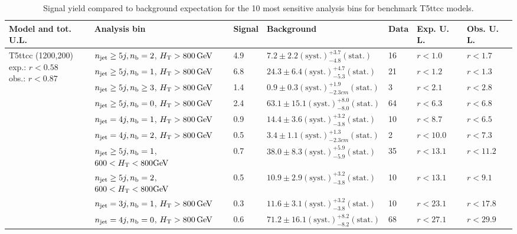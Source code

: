 \begin{table}[h!] 
  \scriptsize
  \caption{ 
Signal yield compared to background expectation for the 10 most sensitive analysis bins 
for benchmark T5ttcc models.
  \label{tab:sigBenchmarksYields_T5ttcc}}
  \centering 
  \begin{tabular}{ lllllll } 
    \hline 
    \hline 
    Model and tot. U.L. & Analysis bin & Signal & Background & Data & Exp. U. L. & Obs. U. L. \\ \hline
\multirow{10}{*}{\parbox[t]{2.3cm}{T5ttcc (1200,200)\\exp.: $r<0.58$\\obs.: $r<0.87$}}
 & $n_{\mathrm{jet}} \geq5j,n_{\text{b}} =2$, $\mbox{$H_\text{T}$} > 800 \, \mathrm{GeV}$ & 4.9 & $7.2 \pm 2.2 \mathrm{(syst.)} ^{+3.7}_{-4.8} \mathrm{(stat.)}$ & 16 & $r < 1.0$ & $r < 1.7$\\ 
 & $n_{\mathrm{jet}} \geq5j,n_{\text{b}} =1$, $\mbox{$H_\text{T}$} > 800 \, \mathrm{GeV}$ & 6.8 & $24.3 \pm 6.4 \mathrm{(syst.)} ^{+4.7}_{-5.3} \mathrm{(stat.)}$ & 21 & $r < 1.2$ & $r < 1.3$\\ 
 & $n_{\mathrm{jet}} \geq5j,n_{\text{b}} \geq3$, $\mbox{$H_\text{T}$} > 800 \, \mathrm{GeV}$ & 1.4 & $0.9 \pm 0.3 \mathrm{(syst.)} ^{+1.9}_{-2.3cm} \mathrm{(stat.)}$ & 3 & $r < 2.1$ & $r < 2.8$\\ 
 & $n_{\mathrm{jet}} \geq5j,n_{\text{b}} =0$, $\mbox{$H_\text{T}$} > 800 \, \mathrm{GeV}$ & 2.4 & $63.1 \pm 15.1 \mathrm{(syst.)} ^{+8.0}_{-8.0} \mathrm{(stat.)}$ & 64 & $r < 6.3$ & $r < 6.8$\\ 
 & $n_{\mathrm{jet}} =4j,n_{\text{b}} =1$, $\mbox{$H_\text{T}$} > 800 \, \mathrm{GeV}$ & 0.9 & $14.4 \pm 3.6 \mathrm{(syst.)} ^{+3.2}_{-3.8} \mathrm{(stat.)}$ & 10 & $r < 8.7$ & $r < 6.5$\\ 
 & $n_{\mathrm{jet}} =4j,n_{\text{b}} =2$, $\mbox{$H_\text{T}$} > 800 \, \mathrm{GeV}$ & 0.5 & $3.4 \pm 1.1 \mathrm{(syst.)} ^{+1.3}_{-2.3cm} \mathrm{(stat.)}$ & 2 & $r < 10.0$ & $r < 7.3$\\ 
 & $n_{\mathrm{jet}} \geq5j,n_{\text{b}} =1$, $600 < \mbox{$H_\text{T}$} < 800 \mathrm{GeV}$ & 0.7 & $38.0 \pm 8.3 \mathrm{(syst.)} ^{+5.9}_{-5.9} \mathrm{(stat.)}$ & 35 & $r < 13.1$ & $r < 11.2$\\ 
 & $n_{\mathrm{jet}} \geq5j,n_{\text{b}} =2$, $600 < \mbox{$H_\text{T}$} < 800 \mathrm{GeV}$ & 0.5 & $10.9 \pm 2.9 \mathrm{(syst.)} ^{+3.2}_{-3.8} \mathrm{(stat.)}$ & 10 & $r < 13.1$ & $r < 9.1$\\ 
 & $n_{\mathrm{jet}} =3j,n_{\text{b}} =1$, $\mbox{$H_\text{T}$} > 800 \, \mathrm{GeV}$ & 0.3 & $11.6 \pm 3.1 \mathrm{(syst.)} ^{+3.2}_{-3.8} \mathrm{(stat.)}$ & 10 & $r < 23.1$ & $r < 17.8$\\ 
 & $n_{\mathrm{jet}} =4j,n_{\text{b}} =0$, $\mbox{$H_\text{T}$} > 800 \, \mathrm{GeV}$ & 0.6 & $71.2 \pm 16.1 \mathrm{(syst.)} ^{+8.2}_{-8.2} \mathrm{(stat.)}$ & 68 & $r < 27.1$ & $r < 29.9$\\ \hline

\end{tabular}
\end{table}
